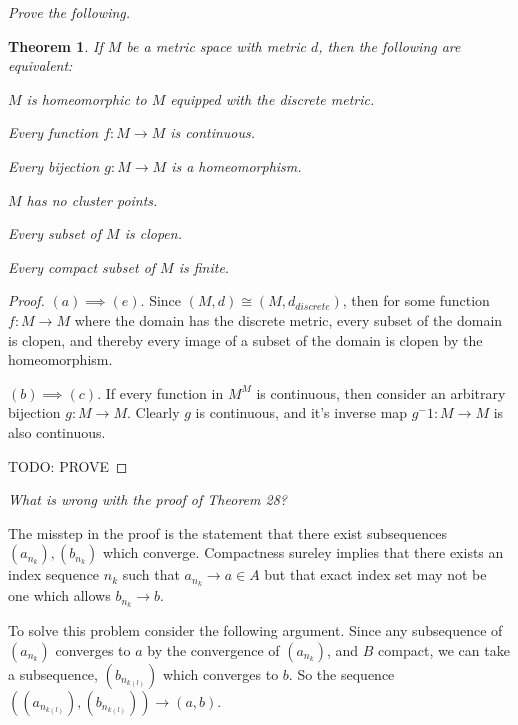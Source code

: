 \documentclass[letter]{article}
\newtheorem{theorem}{Theorem}
\newenvironment{menumerate}{%
  \edef\backupindent{\the\parindent}%
  \enumerate%
  \setlength{\parindent}{\backupindent}%
}{\endenumerate}
\begin{document}
\begin{menumerate}
		\setcounter{enumi}{39}
		\item \emph{Prove the following.}
			\begin{theorem}
				If $M$ be a metric space with metric $d$, then the following are equivalent:
				\begin{menumerate}
					\item $M$ is homeomorphic to $M$ equipped with the discrete metric.
					\item Every function $f:M \to M$ is continuous.
					\item Every bijection $g: M \to M$ is a homeomorphism.
					\item $M$ has no cluster points.
					\item Every subset of $M$ is clopen.
					\item Every compact subset of $M$ is finite.
				\end{menumerate}
			\end{theorem}
			\begin{proof}
				$(a) \implies (e)$. Since $(M,d) \cong (M,d_{discrete})$, then for some function $f:M \to M$ where the domain has the discrete metric, every subset of the domain is clopen, and thereby every image of a subset of the domain is clopen by the homeomorphism.

 
				$(b) \implies (c).$ If every function in $M^{M}$ is continuous, then consider an arbitrary bijection $g: M \to M.$ Clearly $g$ is continuous, and it's inverse map $g^-1 : M \to M$ is also continuous.


					TODO: PROVE
			\end{proof}
			


		\setcounter{enumi}{41}
		\item \emph{What is wrong with the proof of Theorem 28?}

		 The misstep in the proof is the statement that there exist subsequences $(a_{n_k}), (b_{n_k}) $ which converge. Compactness sureley implies that there exists an index sequence $n_k$ such that $a_{n_k} \to a \in A$ but that exact index set may not be one which allows $b_{n_k} \to b$. 

		To solve this problem consider the following argument. Since any subsequence of $(a_{n_k})$ converges to $a$ by the convergence of $(a_{n_k})$, and $B$ compact, we can take a subsequence, $(b_{n_{k(l)}})$ which converges to $b$. So the sequence $((a_{n_{k(l)}}),(b_{n_{k(l)}})) \to (a,b).$



\end{menumerate}
\end{document}
